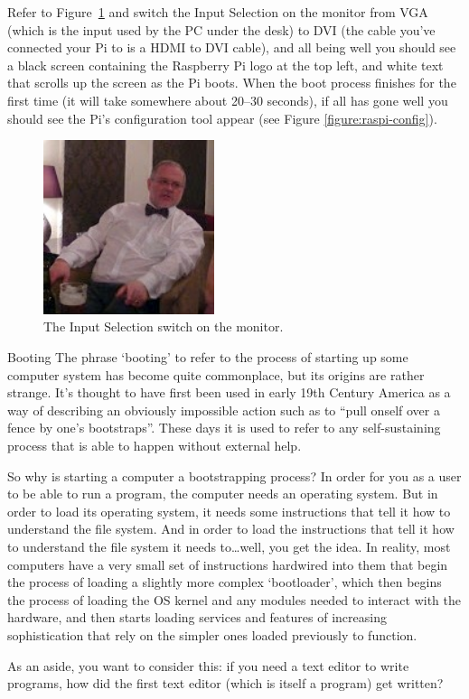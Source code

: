 Refer to Figure~\ref{figure:monitorswitch} and switch the Input Selection on the monitor from VGA (which is the input used by the PC under the desk) to DVI (the cable you've connected your Pi to is a HDMI to DVI cable), and all being well you should see a black screen containing the Raspberry Pi logo at the top left, and white text that scrolls up the screen as the Pi boots. When the boot process finishes for the first time (it will take somewhere about 20--30 seconds), if all has gone well you should see the Pi's configuration tool appear (see Figure \ref{figure:raspi-config}).

\begin{figure}
\centerline{\includegraphics[width=5cm]{images/mysteryimage}}
\caption{The Input Selection switch on the monitor.}\label{figure:monitorswitch}
\end{figure}

\begin{diversion}{Booting}
\label{bootbox}
The phrase `booting' to refer to the process of starting up some computer system has become quite commonplace, but its origins are rather strange. It's thought to have first been used in early 19th Century America as a way of describing an obviously impossible action such as to ``pull onself over a fence by one's bootstraps''. These days it is used to refer to any self-sustaining process that is able to happen without external help. 

So why is starting a computer a bootstrapping process? In order for you as a user to be able to run a program, the computer needs an operating system. But in order to load its operating system, it needs some instructions that tell it how to understand the file system. And in order to load the instructions that tell it how to understand the file system it needs to\ldots well, you get the idea. In reality, most computers have a very small set of instructions hardwired into them that begin the process of loading a  slightly more complex `bootloader', which then begins the process of loading the OS kernel and any modules needed to interact with the hardware, and then starts loading services and features of increasing sophistication that rely on the simpler ones loaded previously to function. 

As an aside, you want to consider this: if you need a text editor to write programs, how did the first text editor (which is itself a program) get written?
\end{diversion}

